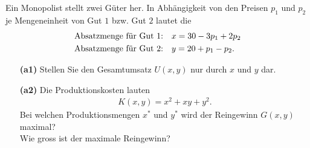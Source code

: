 \subsection*{}
Ein Monopolist stellt zwei Güter her.
In Abhängigkeit von den Preisen $ p_1 $ und $ p_2 $ je Mengeneinheit von Gut $ 1 $ bzw. Gut $ 2 $ lautet die
\begin{align*}
	&\textrm{Absatzmenge für Gut $ 1 $:} \quad 
	x = 30 - 3 p_1 + 2 p_2\\
	&\textrm{Absatzmenge für Gut $ 2 $:} \quad
	y = 20 + p_1 - p_2.
\end{align*}
\begin{enumerate}
	\item[\textbf{(a1)}]
	Stellen Sie den Gesamtumsatz $ U(x,y) $ nur durch $ x $ und $ y  $ dar.
	\item[\textbf{(a2)}] 
	Die Produktionskosten lauten
	\begin{align*}
		K(x,y) = x^2 + xy + y^2.
	\end{align*}
	Bei welchen Produktionsmengen $ x^\ast  $ und $ y^\ast $ wird der Reingewinn $ G(x,y) $ maximal?\\
	Wie gross ist der maximale Reingewinn?
\end{enumerate}
\ \\
